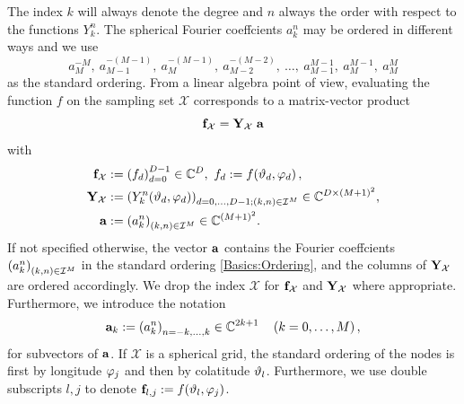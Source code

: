 The index $k$ will always denote the degree and $n$ always the order with respect to the functions $Y_{k}^n$. The spherical Fourier coeffcients $a_{k}^n$ may be ordered 
in different ways and we use
\begin{equation}
  \label{Basics:Ordering}
  a_{M}^{-M},\: a_{M-1}^{-(M-1)},\: a_{M}^{-(M-1)},\: a_{M-2}^{-(M-2)},
  \: \ldots,\: a_{M-1}^{M-1},\: a_{M}^{M-1},\: a_{M}^{M}
\end{equation}
as the standard ordering.
From a linear algebra point of view, evaluating the function $f$ on the sampling set $\mathcal{X}$ corresponds to a matrix-vector product
\[ 
  \mathbf{f}_{\mathcal{X}} = \mathbf{Y}_{\mathcal{X}} \; \mathbf{a}
\]
with
\begin{equation}
  \nonumber
  \begin{split}
    \V{f}_{\mathcal{X}} & := \paren{f_d}_{d=0}^{D-1} \in \C^{D},\ f_{d} := \fun{f}{\vtheta_{d},\vphi_{d}},\\
    \V{Y}_{\mathcal{X}} & := \paren{\fun{Y_k^n}{\vtheta_d,\vphi_d}}_{d=0,\ldots,D-1; 
      \paren{k,n} \in \mathcal{I}^M} \in \C^{D \times \paren{M+1}^2},\\
    \V{a} & := \paren{a_k^n}_{\paren{k,n} \in \mathcal{I}^M} \in \C^{\paren{M+1}^2}.
  \end{split}
\end{equation}
If not specified otherwise, the vector $\mathbf{a}$ contains the Fourier 
coeffcients $\left(a_{k}^n\right)_{(k,n) \in \mathcal{I}^M}$ in the 
standard ordering \eqref{Basics:Ordering}, and the columns of 
$\mathbf{Y}_{\mathcal{X}}$ are ordered accordingly. We drop the 
index $\mathcal{X}$ for $\mathbf{f}_{\mathcal{X}}$ and 
$\mathbf{Y}_{\mathcal{X}}$ where appropriate.
Furthermore, we introduce the notation
\begin{equation}
  \nonumber
  \mathbf{a}_{k} := \left(a_{k}^{n}\right)_{n=-k,\ldots,k} \in \mathbb{C}^{2k+1} \quad \left(k=0,\ldots,M\right),
\end{equation} 
for subvectors of $\mathbf{a}$. If $\mathcal{X}$ is a spherical grid, the standard ordering of the nodes is first by longitude $\varphi_{j}$ and then by 
colatitude $\vartheta_{l}$. 
Furthermore, we use double subscripts $l,j$ to denote $\mathbf{f}_{l,j} := f{\hspace{-0.4ex}}\left(\vartheta_{l},\varphi_{j}\right)$.

